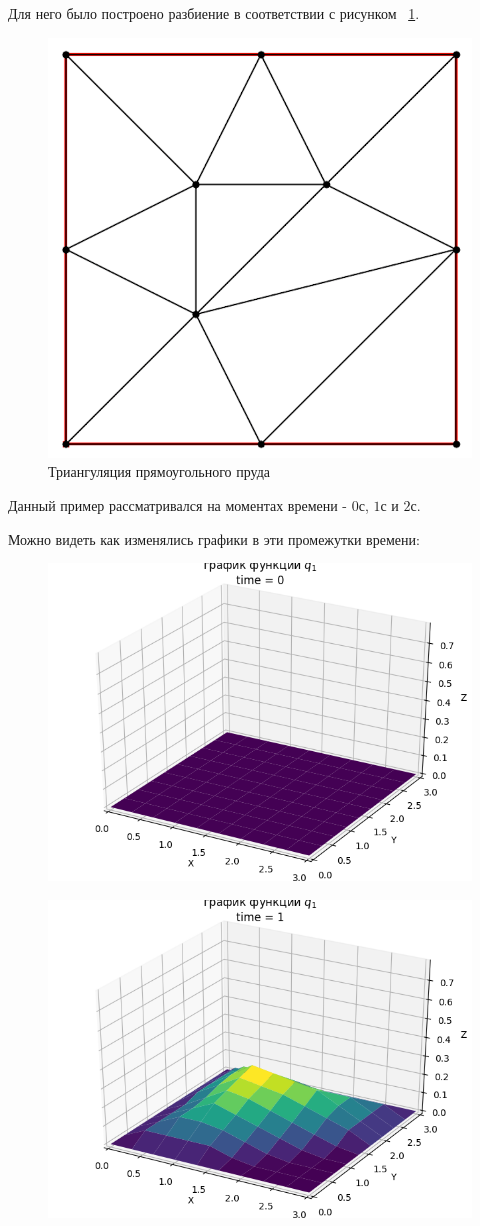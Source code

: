 \documentclass[14pt]{extreport}
\begin{document}
Для него было построено разбиение в соответствии с рисунком ~\ref{img:ex1:mesh}.

\begin{figure}[H]
\centerline{
\includegraphics[width=0.5\linewidth]{images/ex1/mesh}}
\caption{Триангуляция прямоугольного пруда}
\label{img:ex1:mesh}
\end{figure}


Данный пример рассматривался на моментах времени - $0$с, $1$с и $2$с.

Можно видеть как изменялись графики в эти промежутки времени:

\begin{figure}[H]
\centerline{
\includegraphics[width=0.5\linewidth]{images/ex1/q_1/0}}
\caption{}
\label{img:ex1:q1:0}
\end{figure}

\begin{figure}[H]
\centerline{
\includegraphics[width=0.5\linewidth]{images/ex1/q_1/1}}
\caption{}
\label{img:ex1:q1:1}
\end{figure}
\end{document}
